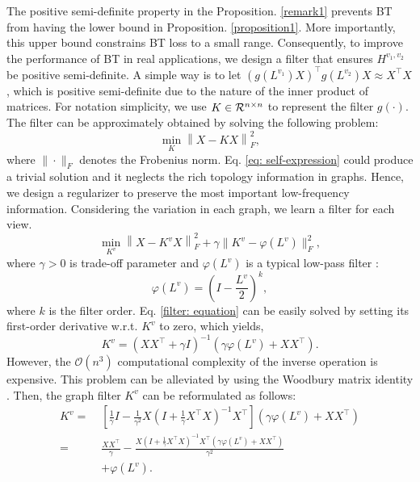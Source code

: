 \documentclass[letterpaper]{article} %
\begin{document}
The positive semi-definite property in the Proposition. \ref{remark1} prevents BT from having the lower bound in Proposition. \ref{proposition1}. More importantly, this upper bound constrains BT loss to a small range.
Consequently, to improve the performance of BT in real applications, we design a filter that ensures $H^{v_1, v_2}$ be positive semi-definite. A simple way is to let $(g(L^{v_1})X)^{\top} g(L^{v_2}) X\approx X^{\top} X $, which is positive semi-definite due to the nature of the inner product of matrices.
For notation simplicity, we use $K \in {\cal{R}}^{n\times n}$ to represent the filter $g(\cdot)$. The filter can be approximately obtained by solving the following problem:
\begin{equation}\label{eq: self-expression}
\min _{K}\left\|X- KX\right\|_F^2,
\end{equation}
where $\|\cdot\|_F$ denotes the Frobenius norm. Eq. \ref{eq: self-expression} could produce a trivial solution and it neglects the rich topology information in graphs. Hence, we design a regularizer to preserve the most important low-frequency information. Considering the variation in each graph, we learn a filter for each view.
\begin{equation}\label{filter: equation}
\min _{K^v}\left\|{X} - K^v {X}\right\|_F^2+\gamma\|K^v -\varphi(L^v)\|_F^2,
\end{equation}
where $\gamma>0$ is trade-off parameter and $\varphi(L^v)$ is a typical low-pass filter \cite{zhang2019attributed}:
\begin{equation}
    \varphi(L^v) = (I - \frac{L^v}{2})^k,
\end{equation}
where $k$ is the filter order. Eq. \ref{filter: equation} can be easily solved by setting its first-order derivative w.r.t. $K^v$ to zero, which yields,
\begin{equation}\label{filter: solution1}
K^v = \left(X {X}^{\top}+\gamma I\right)^{-1}\left(\gamma \varphi(L^v)+X {X}^{\top}\right).
\end{equation}
However, the $\mathcal{O}\left(n^3\right)$ computational complexity of the inverse operation is expensive. This problem can be alleviated by using the Woodbury matrix identity \cite{higham2002accuracy}.
Then, the graph filter $K^v$ can be reformulated as follows:
\begin{equation}\label{filter: solution2}
\begin{aligned}
K^v =\; & [\frac{1}{\gamma} I-\frac{1}{\gamma^2} X(I+\frac{1}{\gamma} {X}^{\top} {X})^{-1} {X}^{\top}]\left(\gamma \varphi(L^v) +{X} {X}^{\top}\right) \\
 =\; & \frac{X {X}^{\top}}{\gamma} -\frac{X (I+\frac{1}{\gamma} {X}^{\top} {X})^{-1}{X}^{\top}
\left(\gamma \varphi(L^v)+X{X}^{\top}\right)}{\gamma^2}\\
 \; & + \varphi(L^v).
\end{aligned}
\end{equation}
\end{document}
